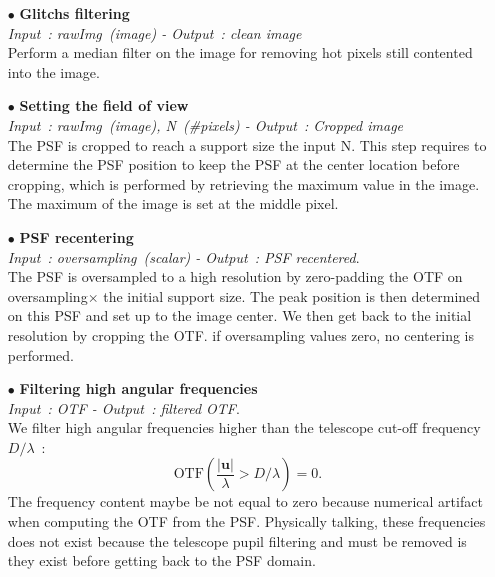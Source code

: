 \documentclass[12pt]{article}
\newcommand{\module}[1]{\left\vert #1 \right\vert}
\newcommand{\para}[1]{\left(#1\right)}
\begin{document}
\begin{itemize}
	\item[$\bullet$] \textbf{Glitchs filtering}\\
	\emph{Input~: rawImg~(image) - Output~: clean image}\\
	Perform a median filter on the image for removing hot pixels still contented into the image.
	
	\item[$\bullet$] \textbf{Setting the field of view}\\
	\emph{Input~: rawImg~(image), N~(\#pixels) - Output~: Cropped image}\\
	 The PSF is cropped to reach a support size the input N. This step requires to determine the PSF position to keep the PSF at the center location before cropping, which is performed by retrieving the maximum value in the image. The maximum of the image is set at the middle pixel.
	 
	\item[$\bullet$] \textbf{PSF recentering}\\
	 \emph{Input~: oversampling~(scalar) - Output~: PSF recentered}.\\
	  The PSF is oversampled to a high resolution by zero-padding the OTF on oversampling$\times$ the initial support size. The peak position is then determined on this PSF and set up to the image center. We then get back to the initial resolution by cropping the OTF. if oversampling values zero, no centering is performed.
	  
	\item[$\bullet$] \textbf{Filtering high angular frequencies}\\
	\emph{Input~: OTF - Output~: filtered OTF}.\\
	We filter high angular frequencies higher than the telescope cut-off frequency $D/\lambda$~:
	\begin{equation}
		\text{OTF}\para{\dfrac{\module{\boldsymbol{u}}}{\lambda} > D/\lambda} = 0.
	\end{equation}
	The frequency content maybe be not equal to zero because numerical artifact when computing the OTF from the PSF. Physically talking, these frequencies does not exist because the telescope pupil filtering and must be removed is they exist before getting back to the PSF domain.
	

\end{itemize}
\end{document}
